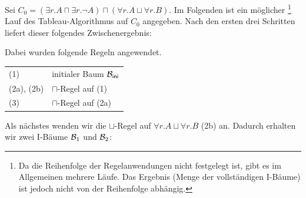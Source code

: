 \documentclass[fontsize=11pt, twoside=false, numbers=autoenddot]{scrbook}
\begin{document}
Sei $C_0 = (\exists r.A \sqcap \exists r.\lnot A) \sqcap (\forall r.A \sqcup \forall r.B)$.
Im Folgenden ist ein möglicher%
\footnote{%
  Da die Reihenfolge der Regelanwendungen nicht festgelegt ist,
  gibt es im Allgemeinen mehrere Läufe.
  Das Ergebnis (Menge der vollständigen I-Bäume) ist jedoch
  nicht von der Reihenfolge abhängig.%
}
Lauf des Tableau-Algorithmus auf $C_0$ angegeben.
Nach den ersten drei Schritten liefert dieser folgendes Zwischenergebnis:
%
\begin{center}
\end{center}
%
Dabei wurden folgende Regeln angewendet.
%
\begin{center}
  \begin{tabular}{@{}ll@{}}
    (1)        & initialer Baum $\mathcal{B}_{\textsf{ini}}$  \\
    (2a), (2b) & $\sqcap$-Regel auf (1)             \\
    (3)        & $\sqcap$-Regel auf (2a)
  \end{tabular}
\end{center}
%
Als nächstes wenden wir die $\sqcup$-Regel auf $\forall r.A \sqcup \forall r.B$ (2b) an.
Dadurch erhalten wir zwei I-Bäume $\mathcal{B}_1$ und $\mathcal{B}_2$:
%
\end{document}

